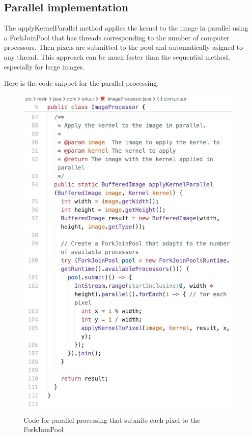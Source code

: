 \documentclass{article}
\begin{document}
\begin{multicols}{2}
    \subsection{Parallel implementation}


    The applyKernelParallel method applies the kernel to the image in parallel using a ForkJoinPool that has threads corresponding to the number of computer processors. Then pixels are submitted to the pool and automatically asigned to any thread. This approach can be much faster than the sequential method, especially for large images.

    Here is the code snippet for the parallel processing:

    \begin{figure}[H]
        \centering
        \includegraphics[width=\linewidth]{img/parallel.jpg}
        \caption{Code for parallel processing that submits each pixel to the ForkJoinPool}
        \label{fig:Parallel Code}
    \end{figure}


\end{multicols}
\end{document}
